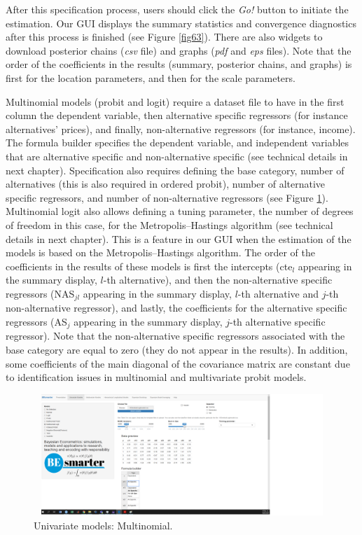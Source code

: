 After this specification process, users should click the \textit{Go!} button to initiate the estimation. Our GUI displays the summary statistics and convergence diagnostics after this process is finished (see Figure \ref{fig63}). There are also widgets to download posterior chains (\textit{csv} file) and graphs (\textit{pdf} and \textit{eps} files). Note that the order of the coefficients in the results (summary, posterior chains, and graphs) is first for the location parameters, and then for the scale parameters.

Multinomial models (probit and logit) require a dataset file to have in the first column the dependent variable, then alternative specific regressors (for instance alternatives' prices), and finally, non-alternative regressors (for instance, income). The formula builder specifies the dependent variable, and independent variables that are alternative specific and non-alternative specific (see technical details in next chapter). Specification also requires defining the base category, number of alternatives (this is also required in ordered probit), number of alternative specific regressors, and number of non-alternative regressors (see Figure \ref{fig64}). Multinomial logit also allows defining a tuning parameter, the number of degrees of freedom in this case, for the Metropolis--Hastings algorithm (see technical details in next chapter). This is a feature in our GUI when the estimation of the models is based on the Metropolis--Hastings algorithm. The order of the coefficients in the results of these models is first the intercepts (cte$_l$ appearing in the summary display, $l$-th alternative), and then the non-alternative specific regressors (NAS$_{jl}$ appearing in the summary display, $l$-th alternative and $j$-th non-alternative regressor), and lastly, the coefficients for the alternative specific regressors (AS$_{j}$ appearing in the summary display, $j$-th alternative specific regressor). Note that the non-alternative specific regressors associated with the base category are equal to zero (they do not appear in the results). In addition, some coefficients of the main diagonal of the covariance matrix are constant due to identification issues in multinomial and multivariate probit models.

\begin{figure}
	\includegraphics[width=340pt, height=130pt]{Chapters/chapterGUI/figures/Figure4.png}
	\caption[List of figure caption goes here]{Univariate models: Multinomial.}\label{fig64}
\end{figure}


